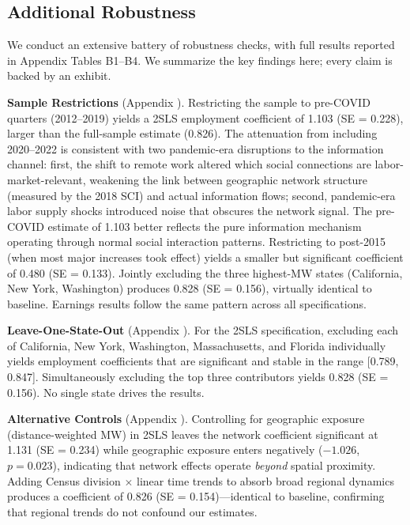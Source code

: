 \documentclass[12pt]{article}
\begin{document}
\subsection{Additional Robustness}

We conduct an extensive battery of robustness checks, with full results reported in Appendix Tables B1--B4. We summarize the key findings here; every claim is backed by an exhibit.

\textbf{Sample Restrictions} (Appendix ). Restricting the sample to pre-COVID quarters (2012--2019) yields a 2SLS employment coefficient of 1.103 (SE = 0.228), larger than the full-sample estimate (0.826). The attenuation from including 2020--2022 is consistent with two pandemic-era disruptions to the information channel: first, the shift to remote work altered which social connections are labor-market-relevant, weakening the link between geographic network structure (measured by the 2018 SCI) and actual information flows; second, pandemic-era labor supply shocks introduced noise that obscures the network signal. The pre-COVID estimate of 1.103 better reflects the pure information mechanism operating through normal social interaction patterns. Restricting to post-2015 (when most major increases took effect) yields a smaller but significant coefficient of 0.480 (SE = 0.133). Jointly excluding the three highest-MW states (California, New York, Washington) produces 0.828 (SE = 0.156), virtually identical to baseline. Earnings results follow the same pattern across all specifications.

\textbf{Leave-One-State-Out} (Appendix ). For the 2SLS specification, excluding each of California, New York, Washington, Massachusetts, and Florida individually yields employment coefficients that are significant and stable in the range [0.789, 0.847]. Simultaneously excluding the top three contributors yields 0.828 (SE = 0.156). No single state drives the results.

\textbf{Alternative Controls} (Appendix ). Controlling for geographic exposure (distance-weighted MW) in 2SLS leaves the network coefficient significant at 1.131 (SE = 0.234) while geographic exposure enters negatively ($-1.026$, $p = 0.023$), indicating that network effects operate \textit{beyond} spatial proximity. Adding Census division $\times$ linear time trends to absorb broad regional dynamics produces a coefficient of 0.826 (SE = 0.154)---identical to baseline, confirming that regional trends do not confound our estimates.
\end{document}
